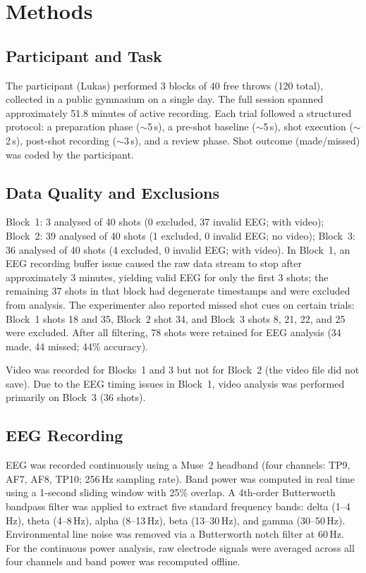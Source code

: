 \documentclass[11pt,a4paper]{article}
\begin{document}
\section{Methods}

\subsection{Participant and Task}
The participant (Lukas) performed 3 blocks of 40 free throws
(120 total), collected in a public gymnasium on a single day. The full session
spanned approximately 51.8 minutes of active recording. Each trial
followed a structured protocol: a preparation phase ($\sim$5\,s), a pre-shot
baseline ($\sim$5\,s), shot execution ($\sim$2\,s), post-shot recording
($\sim$3\,s), and a review phase. Shot outcome (made/missed) was coded by the
participant.

\subsection{Data Quality and Exclusions}
Block~1: 3 analysed of 40 shots (0 excluded, 37 invalid EEG; with video); Block~2: 39 analysed of 40 shots (1 excluded, 0 invalid EEG; no video); Block~3: 36 analysed of 40 shots (4 excluded, 0 invalid EEG; with video). In Block~1, an EEG recording buffer issue caused the raw
data stream to stop after approximately 3 minutes, yielding valid EEG for only
the first 3 shots; the remaining 37 shots in that block had degenerate
timestamps and were excluded from analysis. The experimenter also reported
missed shot cues on certain trials: Block~1 shots 18 and 35, Block~2 shot 34,
and Block~3 shots 8, 21, 22, and 25 were excluded. After all filtering,
78 shots were retained for EEG analysis (34 made, 44
missed; 44\% accuracy).

Video was recorded for Blocks~1 and 3 but not for Block~2 (the video file did
not save). Due to the EEG timing issues in Block~1, video analysis was
performed primarily on Block~3 (36 shots).

\subsection{EEG Recording}
EEG was recorded continuously using a Muse~2 headband (four channels: TP9,
AF7, AF8, TP10; 256\,Hz sampling rate). Band power was computed in real time
using a 1-second sliding window with 25\% overlap. A 4th-order Butterworth
bandpass filter was applied to extract five standard frequency bands: delta
(1--4\,Hz), theta (4--8\,Hz), alpha (8--13\,Hz), beta (13--30\,Hz), and gamma
(30--50\,Hz). Environmental line noise was removed via a Butterworth notch
filter at 60\,Hz. For the continuous power analysis, raw electrode signals were
averaged across all four channels and band power was recomputed offline.
\end{document}
